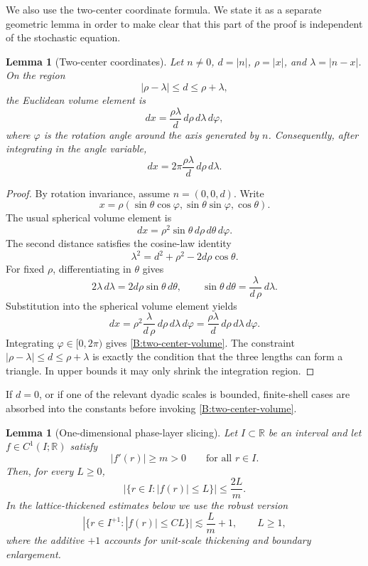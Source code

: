 \documentclass[10pt]{amsart}
\numberwithin{equation}{section}
\theoremstyle{plain}
\newtheorem{lemma}[theorem]{Lemma}
\theoremstyle{definition}
\theoremstyle{remark}
\newcommand{\R}{\mathbb{R}}
\begin{document}
We also use the two-center coordinate formula.  We state it as a separate geometric lemma in order to make clear that this part of the proof is independent of the stochastic equation.

\begin{lemma}[Two-center coordinates]\label{lem:B-two-center}
Let \(n\ne0\), \(d=|n|\), \(\rho=|x|\), and \(\lambda=|n-x|\).  On the region
\[
        |\rho-\lambda|\le d\le\rho+\lambda,
\]
the Euclidean volume element is
\begin{equation}\label{B:two-center-volume-full}
        dx=\frac{\rho\lambda}{d}\,d\rho\,d\lambda\,d\varphi,
\end{equation}
where \(\varphi\) is the rotation angle around the axis generated by \(n\).  Consequently, after integrating in the angle variable,
\begin{equation}\label{B:two-center-volume}
        dx=2\pi\frac{\rho\lambda}{d}\,d\rho\,d\lambda.
\end{equation}
\end{lemma}

\begin{proof}
By rotation invariance, assume \(n=(0,0,d)\).  Write
\[
        x=\rho(\sin\theta\cos\varphi,\sin\theta\sin\varphi,\cos\theta).
\]
The usual spherical volume element is
\[
        dx=\rho^2\sin\theta\,d\rho\,d\theta\,d\varphi.
\]
The second distance satisfies the cosine-law identity
\[
        \lambda^2=d^2+\rho^2-2d\rho\cos\theta.
\]
For fixed \(\rho\), differentiating in \(\theta\) gives
\[
        2\lambda\,d\lambda=2d\rho\sin\theta\,d\theta,
        \qquad
        \sin\theta\,d\theta=\frac{\lambda}{d\,\rho}\,d\lambda.
\]
Substitution into the spherical volume element yields
\[
        dx=\rho^2\frac{\lambda}{d\,\rho}\,d\rho\,d\lambda\,d\varphi
        =\frac{\rho\lambda}{d}\,d\rho\,d\lambda\,d\varphi.
\]
Integrating \(\varphi\in[0,2\pi)\) gives \eqref{B:two-center-volume}.  The constraint
\(|\rho-\lambda|\le d\le \rho+\lambda\) is exactly the condition that the three lengths can form a triangle.  In upper bounds it may only shrink the integration region.
\end{proof}

If \(d=0\), or if one of the relevant dyadic scales is bounded, finite-shell cases are absorbed into the constants before invoking \eqref{B:two-center-volume}.

\begin{lemma}[One-dimensional phase-layer slicing]\label{lem:B-one-dimensional-layer}
Let \(I\subset\R\) be an interval and let \(f\in C^1(I;\R)\) satisfy
\[
        |f'(r)|\ge m>0
        \qquad\text{for all }r\in I.
\]
Then, for every \(L\ge0\),
\[
        |\{r\in I: |f(r)|\le L\}|
        \le \frac{2L}{m}.
\]
In the lattice-thickened estimates below we use the robust version
\[
        |\{r\in I^{+1}: |f(r)|\le CL\}|
        \lesssim \frac{L}{m}+1,
        \qquad L\ge1,
\]
where the additive \(+1\) accounts for unit-scale thickening and boundary enlargement.
\end{lemma}
\end{document}
